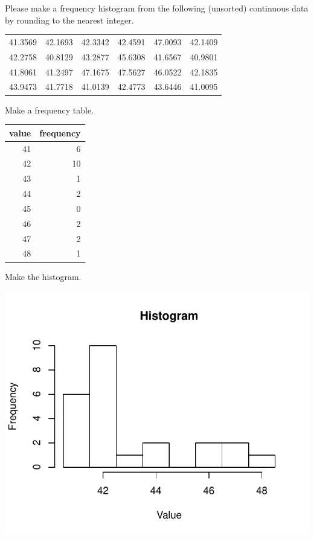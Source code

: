 
\begin{question}
Please make a frequency histogram from the following (unsorted)
continuous data by rounding to the nearest integer.

\begin{longtable}[]{@{}rrrrrr@{}}
\toprule
41.3569 & 42.1693 & 42.3342 & 42.4591 & 47.0093 & 42.1409\tabularnewline
42.2758 & 40.8129 & 43.2877 & 45.6308 & 41.6567 & 40.9801\tabularnewline
41.8061 & 41.2497 & 47.1675 & 47.5627 & 46.0522 & 42.1835\tabularnewline
43.9473 & 41.7718 & 41.0139 & 42.4773 & 43.6446 & 41.0095\tabularnewline
\bottomrule
\end{longtable}
\end{question}

\begin{solution}
Make a frequency table.

\begin{longtable}[]{@{}rr@{}}
\toprule
value & frequency\tabularnewline
\midrule
\endhead
41 & 6\tabularnewline
42 & 10\tabularnewline
43 & 1\tabularnewline
44 & 2\tabularnewline
45 & 0\tabularnewline
46 & 2\tabularnewline
47 & 2\tabularnewline
48 & 1\tabularnewline
\bottomrule
\end{longtable}

Make the histogram.

\includegraphics{barchart-1.pdf}\\
\end{solution}

